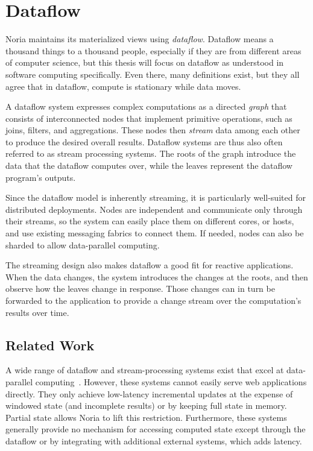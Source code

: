 \section{Dataflow}

Noria maintains its materialized views using \textit{dataflow}. Dataflow means a
thousand things to a thousand people, especially if they are from different
areas of computer science, but this thesis will focus on dataflow as understood
in software computing specifically. Even there, many definitions exist, but they
all agree that in dataflow, compute is stationary while data moves.

A dataflow system expresses complex computations as a directed \emph{graph} that
consists of interconnected nodes that implement primitive operations, such as
joins, filters, and aggregations. These nodes then \emph{stream} data among each
other to produce the desired overall results. Dataflow systems are thus also
often referred to as stream processing systems. The roots of the graph introduce
the data that the dataflow computes over, while the leaves represent the
dataflow program's outputs.

Since the dataflow model is inherently streaming, it is particularly well-suited
for distributed deployments. Nodes are independent and communicate only through
their streams, so the system can easily place them on different cores, or hosts,
and use existing messaging fabrics to connect them. If needed, nodes can also be
sharded to allow data-parallel computing.

The streaming design also makes dataflow a good fit for reactive applications.
When the data changes, the system introduces the changes at the roots, and then
observe how the leaves change in response. Those changes can in turn be
forwarded to the application to provide a change stream over the computation's
results over time.

\subsection*{Related Work}

A wide range of dataflow and stream-processing systems exist that excel at
data-parallel computing~\cite{dryad, naiad, storm, heron, flink, millwheel,
spark-streaming, stanford-stream, s-store, cloud-dataflow}. However, these
systems cannot easily serve web applications directly. They only achieve
low-latency incremental updates at the expense of windowed state (and incomplete
results) or by keeping full state in memory. Partial state allows Noria to lift
this restriction. Furthermore, these systems generally provide no mechanism for
accessing computed state except through the dataflow or by integrating with
additional external systems, which adds latency.

